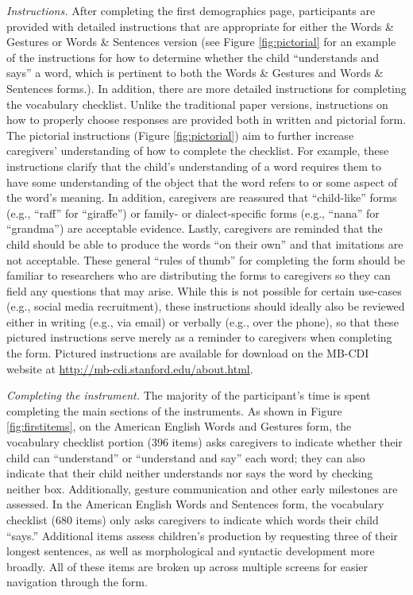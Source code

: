 \documentclass[
  english,
  ,man,floatsintext]{apa6}
\begin{document}
\emph{Instructions.} After completing the first demographics page, participants are provided with detailed instructions that are appropriate for either the Words \& Gestures or Words \& Sentences version (see Figure \ref{fig:pictorial} for an example of the instructions for how to determine whether the child ``understands and says'' a word, which is pertinent to both the Words \& Gestures and Words \& Sentences forms.). In addition, there are more detailed instructions for completing the vocabulary checklist. Unlike the traditional paper versions, instructions on how to properly choose responses are provided both in written and pictorial form. The pictorial instructions (Figure \ref{fig:pictorial}) aim to further increase caregivers' understanding of how to complete the checklist. For example, these instructions clarify that the child's understanding of a word requires them to have some understanding of the object that the word refers to or some aspect of the word's meaning. In addition, caregivers are reassured that ``child-like'' forms (e.g., ``raff'' for ``giraffe'') or family- or dialect-specific forms (e.g., ``nana'' for ``grandma'') are acceptable evidence. Lastly, caregivers are reminded that the child should be able to produce the words ``on their own'' and that imitations are not acceptable. These general ``rules of thumb'' for completing the form should be familiar to researchers who are distributing the forms to caregivers so they can field any questions that may arise. While this is not possible for certain use-cases (e.g., social media recruitment), these instructions should ideally also be reviewed either in writing (e.g., via email) or verbally (e.g., over the phone), so that these pictured instructions serve merely as a reminder to caregivers when completing the form. Pictured instructions are available for download on the MB-CDI website at \url{http://mb-cdi.stanford.edu/about.html}.

\emph{Completing the instrument.} The majority of the participant's time is spent completing the main sections of the instruments. As shown in Figure \ref{fig:firstitems}, on the American English Words and Gestures form, the vocabulary checklist portion (396 items) asks caregivers to indicate whether their child can ``understand'' or ``understand and say'' each word; they can also indicate that their child neither understands nor says the word by checking neither box. Additionally, gesture communication and other early milestones are assessed. In the American English Words and Sentences form, the vocabulary checklist (680 items) only asks caregivers to indicate which words their child ``says.'' Additional items assess children's production by requesting three of their longest sentences, as well as morphological and syntactic development more broadly. All of these items are broken up across multiple screens for easier navigation through the form.
\end{document}

